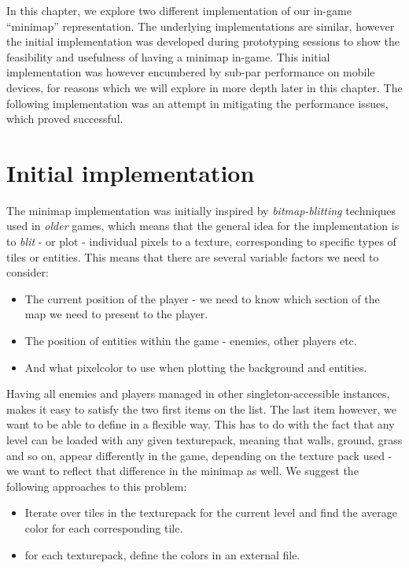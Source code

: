 In this chapter, we explore two different implementation of our in-game
``minimap'' representation. The underlying implementations are similar, however
the initial implementation was developed during prototyping sessions to show
the feasibility and usefulness of having a minimap in-game. This initial
implementation was however encumbered by sub-par performance on mobile devices,
for reasons which we will explore in more depth later in this chapter. The
following implementation was an attempt in mitigating the performance issues,
which proved successful.

\section{Initial implementation}
The minimap implementation was initially inspired by \textit{bitmap-blitting}
techniques used in \textit{older} games, which means that the general idea for
the implementation is to \textit{blit} - or plot - individual pixels to a
texture, corresponding to specific types of tiles or entities. This means that
there are several variable factors we need to consider:

\begin{itemize}
    \item The current position of the player - we need to know which section of
        the map we need to present to the player.
    \item The position of entities within the game - enemies, other players
        etc.
    \item And what pixelcolor to use when plotting the background and entities.
\end{itemize}

Having all enemies and players managed in other singleton-accessible instances,
makes it easy to satisfy the two first items on the list. The last item
however, we want to be able to define in a flexible way. This
has to do with the fact that any level can be loaded with any given
texturepack, meaning that walls, ground, grass and so on, appear differently
in the game, depending on the texture pack used - we want to reflect that
difference in the minimap as well. We suggest the following
approaches to this problem:

\begin{itemize}
    \item Iterate over tiles in the texturepack for the current level and find
        the average color for each corresponding tile.
    \item for each texturepack, define the colors in an external file.
\end{itemize}

